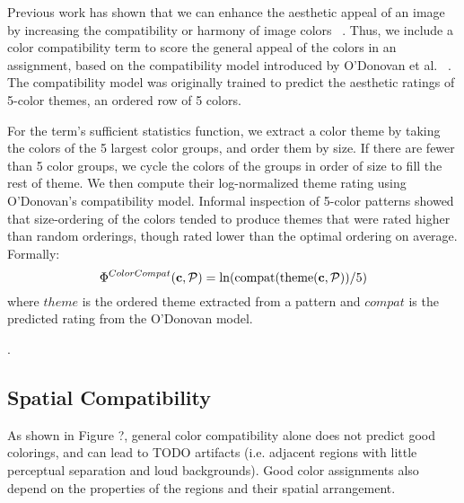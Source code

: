Previous work has shown that we can enhance the aesthetic appeal of an image by increasing the compatibility or harmony of image colors ~\cite{CohenOrHarmonization,DressUp,ColorizationUsingHarmony,ODonovan}. Thus, we include a color compatibility term to score the general appeal of the colors in an assignment, based on the compatibility model introduced by O'Donovan et al. ~\cite{ODonovan}. The compatibility model was originally trained to predict the aesthetic ratings of 5-color themes, an ordered row of 5 colors. 

For the term's sufficient statistics function, we extract a color theme by taking the colors of the 5 largest color groups, and order them by size. If there are fewer than 5 color groups, we cycle the colors of the groups in order of size to fill the rest of theme. We then compute their log-normalized theme rating using O'Donovan's compatibility model. Informal inspection of 5-color patterns showed that size-ordering of the colors tended to produce themes that were rated higher than random orderings, though rated lower than the optimal ordering on average. Formally:
\begin{equation*}
\Phi^{ColorCompat}(\mathbf{c}, \mathcal{P}) = \ln(\text{compat}(\text{theme}(\mathbf{c}, \mathcal{P}))/5)
\end{equation*}
where $theme$ is the ordered theme extracted from a pattern and $compat$ is the predicted rating from the O'Donovan model.~

.


\subsection{Spatial Compatibility}
\label{sec:spatialCompat}

As shown in Figure ?, general color compatibility alone does not predict good colorings, and can lead to TODO artifacts (i.e. adjacent regions with little perceptual separation and loud backgrounds). Good color assignments also depend on the properties of the regions and their spatial arrangement. 

